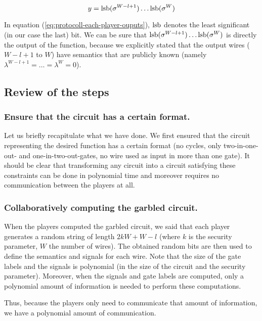\begin{equation}
  \label{eq:protocoll-each-player-ouputs}
  y=\operatorname{lsb}(\sigma^{W-l+1})\dots\operatorname{lsb}(\sigma^W)
\end{equation}

In equation (\ref{eq:protocoll-each-player-ouputs}), $\operatorname{lsb}$ denotes the least significant (in our case the last) bit. We can be sure that $\operatorname{lsb}(\sigma^{W-l+1})\dots\operatorname{lsb}(\sigma^W)$ is directly the output of the function, because we explicitly stated that the output wires ($W-l+1$ to $W$) have semantics that are publicly known (namely $\lambda^{W-l+1}=\dots=\lambda^W=0$).

\subsection{Review of the steps}
\label{sec:review-of-the-protocol}

\subsubsection{Ensure that the circuit has a certain format.}
\label{sec:ensure-that-circuit-has-a-certain-format}

Let us briefly recapitulate what we have done. We first ensured that the circuit representing the desired function has a certain format (no cycles, only two-in-one-out- and one-in-two-out-gates, no wire used as input in more than one gate). It should be clear that transforming any circuit into a circuit satisfying these constraints can be done in polynomial time and moreover requires no communication between the players at all.

\subsubsection{Collaboratively computing the garbled circuit.}
\label{sec:review-computing-garbled-circuit}

When the players computed the garbled circuit, we said that each player generates a random string of length $2kW+W-l$ (where $k$ is the security parameter, $W$ the number of wires). The obtained random bits are then used to define the semantics and signals for each wire. Note that the size of the gate labels and the signals is polynomial (in the size of the circuit and the security parameter). Moreover, when the signals and gate labels are computed, only a polynomial amount of information is needed to perform these computations.

Thus, because the players only need to communicate that amount of information, we have a polynomial amount of communication.

